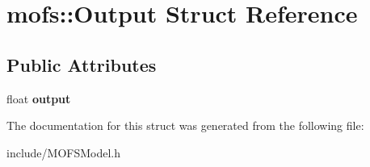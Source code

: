 \hypertarget{structmofs_1_1Output}{\section{mofs\-:\-:Output Struct Reference}
\label{structmofs_1_1Output}
}
\subsection*{Public Attributes}
\begin{DoxyCompactItemize}
\item 
\hypertarget{structmofs_1_1Output_afeeb8bae42f878459b99abd149b47aaf}{float {\bfseries output}}\label{structmofs_1_1Output_afeeb8bae42f878459b99abd149b47aaf}

\end{DoxyCompactItemize}


The documentation for this struct was generated from the following file\-:\begin{DoxyCompactItemize}
\item 
include/M\-O\-F\-S\-Model.\-h\end{DoxyCompactItemize}

